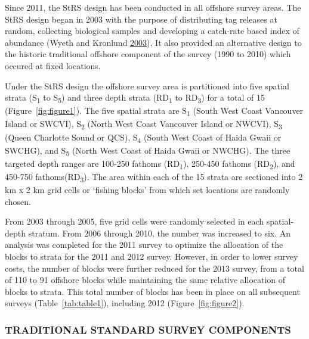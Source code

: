 \documentclass[12pt]{article}\usepackage[]{graphicx}\usepackage[]{color}
\begin{document}
Since 2011, the StRS design has been conducted in all offshore survey areas. The StRS design began in 2003 with the purpose of distributing tag releases at random, collecting biological samples and developing a catch-rate based index of abundance (Wyeth and Kronlund \protect\hyperlink{ref-Wyeth2003}{2003}). It also provided an alternative design to the historic traditional offshore component of the survey (1990 to 2010) which occured at fixed locations.

Under the StRS design the offshore survey area is partitioned into five spatial strata (S\textsubscript{1} to S\textsubscript{5}) and three depth strata (RD\textsubscript{1} to RD\textsubscript{3}) for a total of 15 (Figure~\ref{fig:figure1}). The five spatial strata are S\textsubscript{1} (South West Coast Vancouver Island or SWCVI), S\textsubscript{2} (North West Coast Vancouver Island or NWCVI), S\textsubscript{3} (Queen Charlotte Sound or QCS), S\textsubscript{4} (South West Coast of Haida Gwaii or SWCHG), and S\textsubscript{5} (North West Coast of Haida Gwaii or NWCHG). The three targeted depth ranges are 100-250 fathoms (RD\textsubscript{1}), 250-450 fathoms (RD\textsubscript{2}), and 450-750 fathoms(RD\textsubscript{3}). The area within each of the 15 strata are sectioned into 2 km x 2 km grid cells or `fishing blocks' from which set locations are randomly chosen.

From 2003 through 2005, five grid cells were randomly selected in each spatial-depth stratum. From 2006 through 2010, the number was increased to six. An analysis was completed for the 2011 survey to optimize the allocation of the blocks to strata for the 2011 and 2012 survey. However, in order to lower survey costs, the number of blocks were further reduced for the 2013 survey, from a total of 110 to 91 offshore blocks while maintaining the same relative allocation of blocks to strata. This total number of blocks has been in place on all subsequent surveys (Table~\ref{tab:table1}), including 2012 (Figure~\ref{fig:figure2}).

\hypertarget{traditional-standard-survey-components}{%
\subsubsection{TRADITIONAL STANDARD SURVEY COMPONENTS}\label{traditional-standard-survey-components}}
\end{document}
